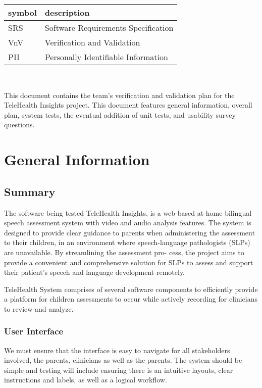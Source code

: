 \documentclass[12pt, titlepage]{article}
\begin{document}
\renewcommand{\arraystretch}{1.2}
\begin{tabular}{l l} 
  \toprule		
  \textbf{symbol} & \textbf{description}\\
  \midrule 
  SRS & Software Requirements Specification\\
  VnV & Verification and Validation\\
  PII & Personally Identifiable Information\\
  \bottomrule
\end{tabular}\\

\newpage


\hspace{2 em} This document contains the team's verification and validation plan for the TeleHealth
Insights project. This document features general information, overall plan, system tests,
the eventual addition of unit tests, and usability survey questions.

\section{General Information}

\subsection{Summary}

  The software being tested TeleHealth Insights, is a web-based at-home bilingual
  speech assessment system with video and audio analysis features. The system is designed to provide clear 
  guidance to parents when administering the assessment to their children, in an environment where speech-language
  pathologists (SLPs) are unavailable. By streamlining the assessment pro-
  cess, the project aims to provide a convenient and comprehensive solution
  for SLPs to assess and support their patient's speech and language development remotely.

  TeleHealth System comprises of several software components to efficiently provide 
  a platform for children assessments to occur while actively recording for clinicians to review and analyze. 

  \subsubsection{User Interface}

  We must ensure that the interface is easy to navigate for all stakeholders involved, the parents, 
  clinicians as well as the parents. The system should be simple and testing will include ensuring 
  there is an intuitive layouts, clear instructions and labels, as well as a logical workflow.
\end{document}
